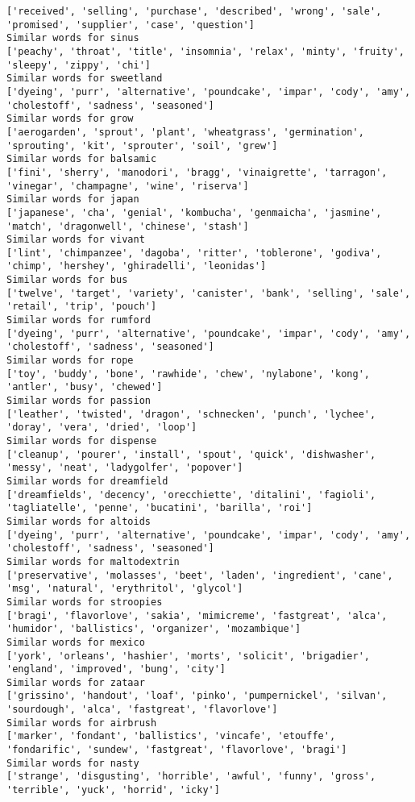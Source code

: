 \documentclass[11pt]{article}
\begin{document}
\begin{Verbatim}[commandchars=\\\{\}]
['received', 'selling', 'purchase', 'described', 'wrong', 'sale', 'promised', 'supplier', 'case', 'question']
Similar words for sinus
['peachy', 'throat', 'title', 'insomnia', 'relax', 'minty', 'fruity', 'sleepy', 'zippy', 'chi']
Similar words for sweetland
['dyeing', 'purr', 'alternative', 'poundcake', 'impar', 'cody', 'amy', 'cholestoff', 'sadness', 'seasoned']
Similar words for grow
['aerogarden', 'sprout', 'plant', 'wheatgrass', 'germination', 'sprouting', 'kit', 'sprouter', 'soil', 'grew']
Similar words for balsamic
['fini', 'sherry', 'manodori', 'bragg', 'vinaigrette', 'tarragon', 'vinegar', 'champagne', 'wine', 'riserva']
Similar words for japan
['japanese', 'cha', 'genial', 'kombucha', 'genmaicha', 'jasmine', 'match', 'dragonwell', 'chinese', 'stash']
Similar words for vivant
['lint', 'chimpanzee', 'dagoba', 'ritter', 'toblerone', 'godiva', 'chimp', 'hershey', 'ghiradelli', 'leonidas']
Similar words for bus
['twelve', 'target', 'variety', 'canister', 'bank', 'selling', 'sale', 'retail', 'trip', 'pouch']
Similar words for rumford
['dyeing', 'purr', 'alternative', 'poundcake', 'impar', 'cody', 'amy', 'cholestoff', 'sadness', 'seasoned']
Similar words for rope
['toy', 'buddy', 'bone', 'rawhide', 'chew', 'nylabone', 'kong', 'antler', 'busy', 'chewed']
Similar words for passion
['leather', 'twisted', 'dragon', 'schnecken', 'punch', 'lychee', 'doray', 'vera', 'dried', 'loop']
Similar words for dispense
['cleanup', 'pourer', 'install', 'spout', 'quick', 'dishwasher', 'messy', 'neat', 'ladygolfer', 'popover']
Similar words for dreamfield
['dreamfields', 'decency', 'orecchiette', 'ditalini', 'fagioli', 'tagliatelle', 'penne', 'bucatini', 'barilla', 'roi']
Similar words for altoids
['dyeing', 'purr', 'alternative', 'poundcake', 'impar', 'cody', 'amy', 'cholestoff', 'sadness', 'seasoned']
Similar words for maltodextrin
['preservative', 'molasses', 'beet', 'laden', 'ingredient', 'cane', 'msg', 'natural', 'erythritol', 'glycol']
Similar words for stroopies
['bragi', 'flavorlove', 'sakia', 'mimicreme', 'fastgreat', 'alca', 'humidor', 'ballistics', 'organizer', 'mozambique']
Similar words for mexico
['york', 'orleans', 'hashier', 'morts', 'solicit', 'brigadier', 'england', 'improved', 'bung', 'city']
Similar words for zataar
['grissino', 'handout', 'loaf', 'pinko', 'pumpernickel', 'silvan', 'sourdough', 'alca', 'fastgreat', 'flavorlove']
Similar words for airbrush
['marker', 'fondant', 'ballistics', 'vincafe', 'etouffe', 'fondarific', 'sundew', 'fastgreat', 'flavorlove', 'bragi']
Similar words for nasty
['strange', 'disgusting', 'horrible', 'awful', 'funny', 'gross', 'terrible', 'yuck', 'horrid', 'icky']

\end{Verbatim}
\end{document}
